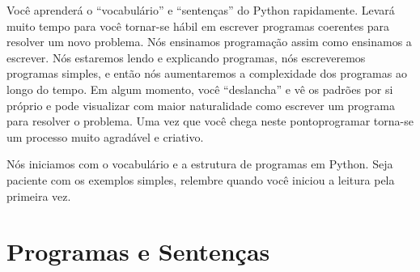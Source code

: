Você aprenderá o ``vocabulário'' e ``sentenças'' do Python rapidamente.
Levará muito tempo para você tornar-se hábil em escrever programas coerentes
para resolver um novo problema. Nós ensinamos programação assim como ensinamos
a escrever. Nós estaremos lendo e explicando programas, nós escreveremos programas
simples, e então nós aumentaremos a complexidade dos programas ao longo do tempo.
Em algum momento, você ``deslancha'' e vê os padrões por si próprio e pode visualizar
com maior naturalidade como escrever um programa para resolver o problema. Uma
vez que você chega neste pontoprogramar torna-se um processo muito agradável e
criativo.
%

Nós iniciamos com o vocabulário e a estrutura de programas em Python. Seja paciente
com os exemplos simples, relembre quando você iniciou a leitura pela primeira vez.
%

\section{Programas e Sentenças}
%

